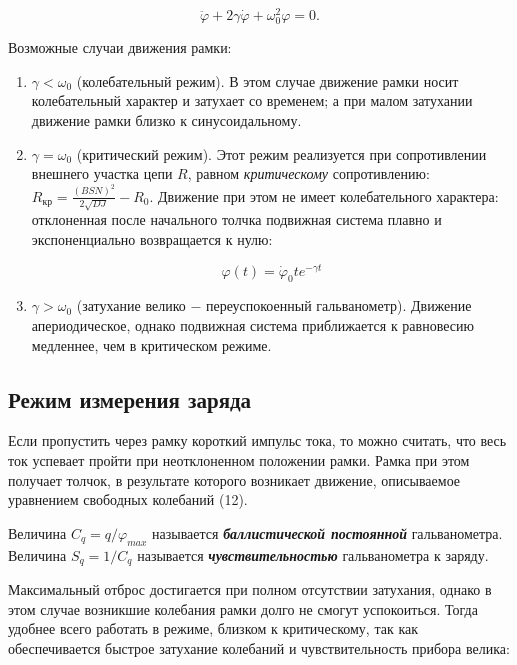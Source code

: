 \documentclass[a4paper,12pt]{article} %
\begin{document}
\begin{equation}\label{ linkname }
\ddot \varphi + 2\gamma\dot\varphi + \omega_{0}^2\varphi = 0.
\end{equation}

\hfill \break Возможные случаи движения рамки:

\begin{enumerate}
    \item{$\gamma < \omega_{0}$ (колебательный режим). В этом случае движение рамки носит колебательный характер и затухает со временем; а при малом затухании движение рамки близко к синусоидальному.}
    \item {$\gamma = \omega_{0}$ (критический режим). Этот режим реализуется при сопротивлении внешнего участка цепи $R$, равном \textit{критическому} сопротивлению: $R_\text{кр} = \frac{(BSN)^2}{2\sqrt{DJ}} - R_{0}$. Движение при этом не имеет колебательного характера: отклоненная после начального толчка подвижная система плавно и экспоненциально возвращается к нулю:

    $$
    \varphi(t) = \dot\varphi_{0}te^{-\gamma t}
    $$}

    \item{$\gamma > \omega_{0}$ (затухание велико $-$ переуспокоенный гальванометр). Движение апериодическое, однако подвижная система приближается к равновесию медленнее, чем в критическом режиме.}
\end{enumerate}

\subsection{Режим измерения заряда}
\hfill \break Если пропустить через рамку короткий импульс тока, то можно считать, что весь ток успевает пройти при неотклоненном положении рамки. Рамка при этом получает толчок, в результате которого возникает движение, описываемое уравнением свободных колебаний (12). 

\hfill \break Величина $C_{q} = q/\varphi_{max}$ называется \textit{\textbf{баллистической постоянной}} гальванометра. Величина $S_{q} = 1/C_{q}$ называется \textit{\textbf{чувствительностью}} гальванометра к заряду. 

\hfill \break Максимальный отброс достигается при полном отсутствии затухания, однако в этом случае возникшие колебания рамки долго не смогут успокоиться. Тогда удобнее всего работать в режиме, близком к критическому, так как обеспечивается быстрое затухание колебаний и чувствительность прибора велика:
\end{document}
